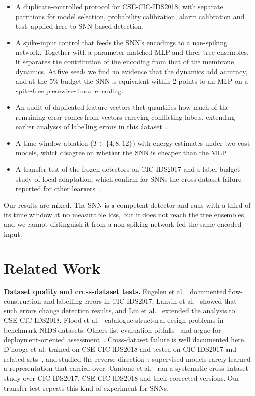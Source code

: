 \documentclass[conference]{IEEEtran}
\begin{document}
\begin{itemize}
\item A duplicate-controlled protocol for CSE-CIC-IDS2018, with separate partitions for model selection, probability calibration, alarm calibration and test, applied here to SNN-based detection.
\item A spike-input control that feeds the SNN's encodings to a non-spiking network. Together with a parameter-matched MLP and three tree ensembles, it separates the contribution of the encoding from that of the membrane dynamics. At five seeds we find no evidence that the dynamics add accuracy, and at the 5\% budget the SNN is equivalent within 2 points to an MLP on a spike-free piecewise-linear encoding.
\item An audit of duplicated feature vectors that quantifies how much of the remaining error comes from vectors carrying conflicting labels, extending earlier analyses of labelling errors in this dataset~\cite{liu2022}.
\item A time-window ablation ($T \in \{4,8,12\}$) with energy estimates under two cost models, which disagree on whether the SNN is cheaper than the MLP.
\item A transfer test of the frozen detectors on CIC-IDS2017 and a label-budget study of local adaptation, which confirm for SNNs the cross-dataset failure reported for other learners~\cite{dhooge2023sensors,cantone2024}.
\end{itemize}

Our results are mixed. The SNN is a competent detector and runs with a third of its time window at no measurable loss, but it does not reach the tree ensembles, and we cannot distinguish it from a non-spiking network fed the same encoded input.

\section{Related Work}

\textbf{Dataset quality and cross-dataset tests.} Engelen et al.~\cite{engelen2021} documented flow-construction and labelling errors in CIC-IDS2017, Lanvin et al.~\cite{lanvin2023} showed that such errors change detection results, and Liu et al.~\cite{liu2022} extended the analysis to CSE-CIC-IDS2018. Flood et al.~\cite{flood2024} catalogue structural design problems in benchmark NIDS datasets. Others list evaluation pitfalls~\cite{arp2022,sommer2010} and argue for deployment-oriented assessment~\cite{apruzzese2023sok}. Cross-dataset failure is well documented here. D'hooge et al. trained on CSE-CIC-IDS2018 and tested on CIC-IDS2017 and related sets~\cite{dhooge2023sensors}, and studied the reverse direction~\cite{dhooge2023jcp}; supervised models rarely learned a representation that carried over. Cantone et al.~\cite{cantone2024} ran a systematic cross-dataset study over CIC-IDS2017, CSE-CIC-IDS2018 and their corrected versions. Our transfer test repeats this kind of experiment for SNNs.
\end{document}
